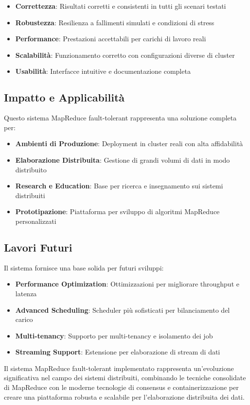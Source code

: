 \documentclass[12pt,a4paper]{article}
\begin{document}
\begin{itemize}
\item \textbf{Correttezza}: Risultati corretti e consistenti in tutti gli scenari testati
\item \textbf{Robustezza}: Resilienza a fallimenti simulati e condizioni di stress
\item \textbf{Performance}: Prestazioni accettabili per carichi di lavoro reali
\item \textbf{Scalabilità}: Funzionamento corretto con configurazioni diverse di cluster
\item \textbf{Usabilità}: Interfacce intuitive e documentazione completa
\end{itemize}

\subsection{Impatto e Applicabilità}

Questo sistema MapReduce fault-tolerant rappresenta una soluzione completa per:

\begin{itemize}
\item \textbf{Ambienti di Produzione}: Deployment in cluster reali con alta affidabilità
\item \textbf{Elaborazione Distribuita}: Gestione di grandi volumi di dati in modo distribuito
\item \textbf{Research e Education}: Base per ricerca e insegnamento sui sistemi distribuiti
\item \textbf{Prototipazione}: Piattaforma per sviluppo di algoritmi MapReduce personalizzati
\end{itemize}

\subsection{Lavori Futuri}

Il sistema fornisce una base solida per futuri sviluppi:

\begin{itemize}
\item \textbf{Performance Optimization}: Ottimizzazioni per migliorare throughput e latenza
\item \textbf{Advanced Scheduling}: Scheduler più sofisticati per bilanciamento del carico
\item \textbf{Multi-tenancy}: Supporto per multi-tenancy e isolamento dei job
\item \textbf{Streaming Support}: Estensione per elaborazione di stream di dati
\end{itemize}

Il sistema MapReduce fault-tolerant implementato rappresenta un'evoluzione significativa nel campo dei sistemi distribuiti, combinando le tecniche consolidate di MapReduce con le moderne tecnologie di consensus e containerizzazione per creare una piattaforma robusta e scalabile per l'elaborazione distribuita dei dati.
\end{document}
